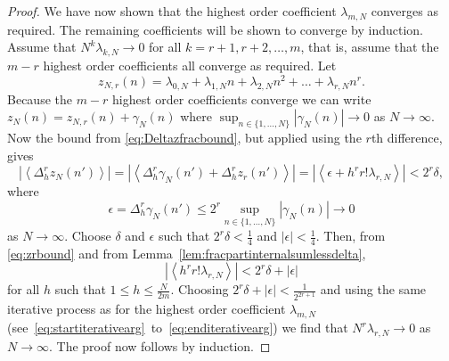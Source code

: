 \documentclass[aap]{imsart}
\renewcommand{\mid}{\; ; \;}
\newcommand{\fracpart}[1]{\left\langle #1 \right\rangle}
\newcommand{\abs}[1]{\left\vert #1 \right\vert}
\newtheorem{lemma}{Lemma}
\begin{document}
\begin{proof}
We have now shown that the highest order coefficient $\lambda_{m,N}$ converges as required. The remaining coefficients will be shown to converge by induction.  Assume that $N^k \lambda_{k,N} \rightarrow 0$ for all $k=r+1, r+2, \dots, m$, that is, assume that the $m-r$ highest order coefficients all converge as required. Let
\[
z_{N,r}(n) = \lambda_{0,N} + \lambda_{1,N} n + \lambda_{2,N} n^2 + \dots + \lambda_{r,N} n^r.
\]
Because the $m-r$ highest order coefficients converge we can write $z_N(n) = z_{N,r}(n) + \gamma_N(n)$ where $\sup_{n\in\{1,\dots,N\}}\abs{\gamma_N(n)} \rightarrow 0$ as $N\rightarrow\infty$. Now the bound from \eqref{eq:Deltazfracbound}, but applied using the $r$th difference, gives
 \begin{equation}\label{eq:zrbound}
\left|\fracpart{  \Delta_h^r z_N(n')}\right| = \left|\fracpart{  \Delta_h^r\gamma_N(n') + \Delta_h^r z_r(n') }\right| = |\fracpart{ \epsilon + h^r r! \lambda_{r,N} }| < 2^r\delta,
 \end{equation}
 where
\[
\epsilon = \Delta_h^r \gamma_N(n') \leq 2^r \sup_{n\in\{1,\dots,N\}}\abs{\gamma_N(n)} \rightarrow 0
\] 
as $N\rightarrow\infty$.  Choose $\delta$ and $\epsilon$ such that $2^r\delta < \tfrac{1}{4}$ and $|\epsilon| < \tfrac{1}{4}$.  Then, from \eqref{eq:zrbound} and from Lemma~\ref{lem:fracpartinternalsumlessdelta},
\[
\abs{\fracpart{ h^r r! \lambda_{r,N} }} < 2^r\delta + \abs{\epsilon}
\]
for all $h$ such that $1 \leq h \leq \tfrac{N}{2m}$.  Choosing $2^r\delta + |\epsilon| < \frac{1}{2^{2r+1}}$ and using the same iterative process as for the highest order coefficient $\lambda_{m,N}$  (see~\eqref{eq:startiterativearg}~to~\eqref{eq:enditerativearg}) we find that $N^r \lambda_{r,N} \rightarrow 0$ as $N\rightarrow\infty$.  The proof now follows by induction.
 \end{proof}

\end{document}
